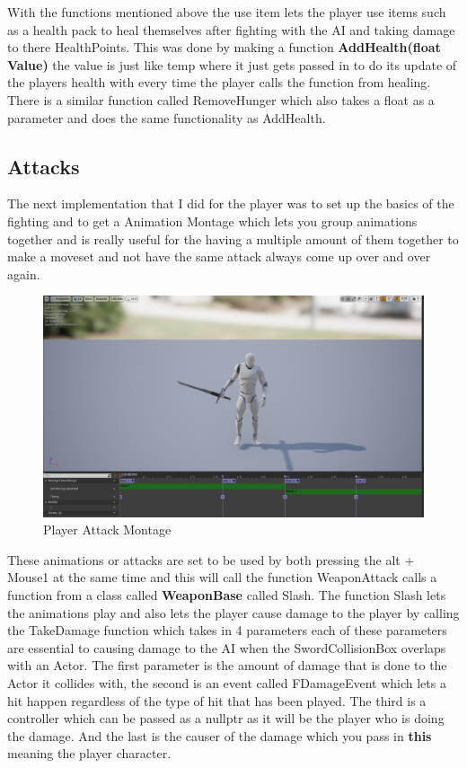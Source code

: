With the functions mentioned above the use item lets the player use items such as a health pack to heal themselves after fighting with the AI and taking damage to there HealthPoints. This was done by making a function \textbf{AddHealth(float Value)} the value is just like temp where it just gets passed in to do its update of the players health with every time the player calls the function from healing. There is a similar function called RemoveHunger which also takes a float as a parameter and does the same functionality as AddHealth.
\newline
\newline
\subsection{Attacks}
The next implementation that I did for the player was to set up the basics of the fighting and to get a Animation Montage which lets you group animations together and is really useful for the having a multiple amount of them together to make a moveset and not have the same attack always come up over and over again. 
\begin{figure}[H]
    \centering
    \includegraphics[scale=.3]{img/AnimationMontage.PNG}
    \caption{Player Attack Montage}
    \label{Attack Montage}
\end{figure}
These animations or attacks are set to be used by both pressing the alt + Mouse1 at the same time and this will call the function WeaponAttack calls a function from a class called \textbf{WeaponBase} called Slash. The function Slash lets the animations play and also lets the player cause damage to the player by calling the TakeDamage function which takes in 4 parameters each of these parameters are essential to causing damage to the AI when the SwordCollisionBox overlaps with an Actor. The first parameter is the amount of damage that is done to the Actor it collides with, the second is an event called FDamageEvent which lets a hit happen regardless of the type of hit that has been played. The third is a controller which can be passed as a nullptr as it will be the player who is doing the damage. And the last is the causer of the damage which you pass in \textbf{this} meaning the player character.
